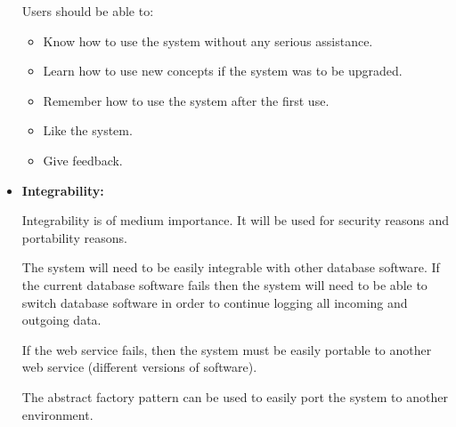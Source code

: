 \begin{flushleft}
\begin{itemize}
		Users should be able to:
		\begin{itemize}
		\item Know how to use the system without any serious assistance.
		\item Learn how to use new concepts if the system was to be upgraded.
		\item Remember how to use the system after the first use.
		\item Like the system.
		\item Give feedback. 
		\end{itemize}
		
		\item \textbf{Integrability:} 
		
		Integrability is of medium importance. It will be used for security reasons and portability reasons. \newline
		
		The system will need to be easily integrable with other database software. If the current database software fails then the system will need to be able to switch database software in order to continue logging all incoming and outgoing data. \newline
		
		If the web service fails, then the system must be easily portable to another web service (different versions of software). \newline
		
		The abstract factory pattern can be used to easily port the system to another environment. \newline
	\end{itemize}
	
\end{flushleft}

